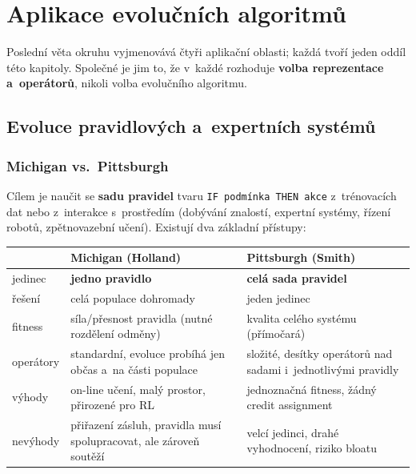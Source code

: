 \documentclass[11pt,a4paper]{article}
\theoremstyle{definition}
\begin{document}
\section{Aplikace evolučních algoritmů}
\label{sec:aplikace}

Poslední věta okruhu vyjmenovává čtyři aplikační oblasti; každá tvoří jeden oddíl této
kapitoly. Společné je jim to, že v~každé rozhoduje \textbf{volba reprezentace a~operátorů},
nikoli volba  evolučního algoritmu.

\subsection{Evoluce pravidlových a~expertních systémů}
\label{sec:lcs}

\subsubsection{Michigan vs.\ Pittsburgh}

Cílem je naučit se \textbf{sadu pravidel} tvaru \texttt{IF podmínka THEN akce}
z~trénovacích dat nebo z~interakce s~prostředím (dobývání znalostí, expertní
systémy, řízení robotů, zpětnovazební učení). Existují dva základní přístupy:

\begin{center}
\begin{tabular}{@{}p{2.8cm}p{6.2cm}p{6.2cm}@{}}
\toprule
 & \textbf{Michigan} (Holland) & \textbf{Pittsburgh} (Smith) \\
\midrule
jedinec & \textbf{jedno pravidlo} & \textbf{celá sada pravidel} \\
řešení & celá populace dohromady & jeden jedinec \\
fitness & síla/přesnost pravidla (nutné rozdělení odměny) & kvalita celého
  systému (přímočará) \\
operátory & standardní, evoluce probíhá jen občas a~na části populace &
  složité, desítky operátorů nad sadami i~jednotlivými pravidly \\
výhody & on-line učení, malý prostor, přirozené pro RL & jednoznačná fitness,
  žádný credit assignment \\
nevýhody & přiřazení zásluh, pravidla musí spolupracovat, ale zároveň soutěží &
  velcí jedinci, drahé vyhodnocení, riziko bloatu \\
\bottomrule
\end{tabular}
\end{center}
\end{document}
